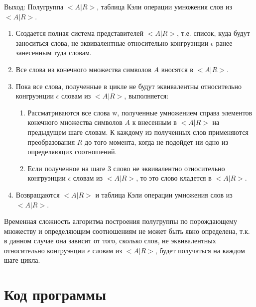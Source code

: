 \documentclass[bachelor, och, labwork]{shiza}
\begin{document}
	$\textit{Выход:}$  Полугруппа $<A|R>$, таблица Кэли операции умножения слов из $<A|R>$.
	
	\begin{enumerate} 
		\item Создается полная система представителей $<A|R>$, т.е. список, куда будут заноситься слова, не эквивалентные относительно конгруэнции $\epsilon$ ранее занесенным туда словам.
		\item Все слова из конечного множества символов $A$ вносятся в $<A|R>$.
		\item Пока все слова, полученные в цикле не будут эквивалентны относительно конгруэнции $\epsilon$ словам из $<A|R>$, выполняется: 
		\begin{enumerate} 
			\item Рассматриваются все слова w, полученные умножением справа элементов конечного множества символов $A$ к внесенным в $<A|R>$ на предыдущем шаге словам. К каждому из полученных слов применяются преобразования $R$ до того момента, когда не подойдет ни одно из определяющих соотношений. 
			\item Если полученное на шаге 3 слово не эквивалентно относительно конгруэнции $\epsilon$ словам из $<A|R>$, то это слово кладется в $<A|R>$.
		\end{enumerate} 
	\item Возвращаются $<A|R>$ и таблица Кэли операции умножения слов из $<A|R>$.
	\end{enumerate} 

	Временная сложность алгоритма построения полугруппы по порождающему множеству и определяющим соотношениям не может быть явно определена, т.к. в данном случае она зависит от того, сколько слов, не эквивалентных относительно конгруэнции $\epsilon$ словам из $<A|R>$, будет получаться на каждом шаге цикла.

	\section{Код программы}		
	
\end{document}
